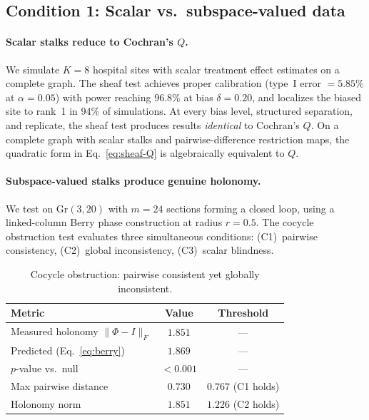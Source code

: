 \documentclass[11pt]{article}
\newcommand{\Gr}{\mathrm{Gr}}
\begin{document}
\subsection{Condition 1: Scalar vs.\ subspace-valued data}
\label{sec:res-scalar-vs-subspace}

\paragraph{Scalar stalks reduce to Cochran's $Q$.}
We simulate $K = 8$ hospital sites with scalar treatment effect estimates on a complete graph.
The sheaf test achieves proper calibration (type~I error $= 5.85\%$ at $\alpha = 0.05$) with power reaching $96.8\%$ at bias $\delta = 0.20$, and localizes the biased site to rank~1 in 94\% of simulations.
At every bias level, structured separation, and replicate, the sheaf test produces results \emph{identical} to Cochran's $Q$.
On a complete graph with scalar stalks and pairwise-difference restriction maps, the quadratic form in Eq.~\eqref{eq:sheaf-Q} is algebraically equivalent to $Q$.

\paragraph{Subspace-valued stalks produce genuine holonomy.}
We test on $\Gr(3, 20)$ with $m = 24$ sections forming a closed loop, using a linked-column Berry phase construction at radius $r = 0.5$.
The cocycle obstruction test evaluates three simultaneous conditions: (C1)~pairwise consistency, (C2)~global inconsistency, (C3)~scalar blindness.

\begin{table}[t]
\centering
\caption{Cocycle obstruction: pairwise consistent yet globally inconsistent.}
\label{tab:cocycle}
\small
\begin{tabular}{@{}lcc@{}}
\toprule
\textbf{Metric} & \textbf{Value} & \textbf{Threshold} \\
\midrule
Measured holonomy $\|\Phi - I\|_F$ & $1.851$ & --- \\
Predicted (Eq.~\ref{eq:berry}) & $1.869$ & --- \\
$p$-value vs.\ null & $< 0.001$ & --- \\
\midrule
Max pairwise distance & $0.730$ & $0.767$ (C1 holds) \\
Holonomy norm & $1.851$ & $1.226$ (C2 holds) \\
\bottomrule
\end{tabular}
\end{table}
\end{document}
